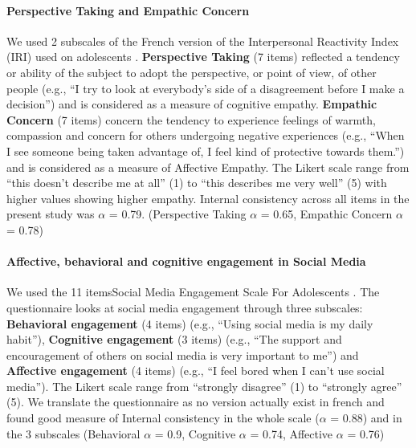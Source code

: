 \documentclass[preprint, 3p,
authoryear]{elsarticle} %
\begin{document}
\hypertarget{perspective-taking-and-empathic-concern}{%
\paragraph{Perspective Taking and Empathic
Concern}\label{perspective-taking-and-empathic-concern}}

We used 2 subscales of the French version \citep{gilet_assessing_2013}
of the Interpersonal Reactivity Index (IRI)
\citep{davis_interpersonal_1980} used on adolescents
\citep{hawk_examining_2013}. \textbf{Perspective Taking} (7 items)
reflected a tendency or ability of the subject to adopt the perspective,
or point of view, of other people (e.g., ``I try to look at everybody's
side of a disagreement before I make a decision'') and is considered as
a measure of cognitive empathy. \textbf{Empathic Concern} (7 items)
concern the tendency to experience feelings of warmth, compassion and
concern for others undergoing negative experiences (e.g., ``When I see
someone being taken advantage of, I feel kind of protective towards
them.'') and is considered as a measure of Affective Empathy. The Likert
scale range from ``this doesn't describe me at all'' (1) to ``this
describes me very well'' (5) with higher values showing higher empathy.
Internal consistency across all items in the present study was
\(\alpha\) = 0.79. (Perspective Taking \(\alpha\) = 0.65, Empathic
Concern \(\alpha\) = 0.78)

\hypertarget{affective-behavioral-and-cognitive-engagement-in-social-media}{%
\paragraph{Affective, behavioral and cognitive engagement in Social
Media}\label{affective-behavioral-and-cognitive-engagement-in-social-media}}

We used the 11 itemsSocial Media Engagement Scale For Adolescents
\citep{ni_development_2020}. The questionnaire looks at social media
engagement through three subscales: \textbf{Behavioral engagement} (4
items) (e.g., ``Using social media is my daily habit''),
\textbf{Cognitive engagement} (3 items) (e.g., ``The support and
encouragement of others on social media is very important to me'') and
\textbf{Affective engagement} (4 items) (e.g., ``I feel bored when I
can't use social media''). The Likert scale range from ``strongly
disagree'' (1) to ``strongly agree'' (5). We translate the questionnaire
as no version actually exist in french and found good measure of
Internal consistency in the whole scale (\(\alpha\) = 0.88) and in the 3
subscales (Behavioral \(\alpha\) = 0.9, Cognitive \(\alpha\) = 0.74,
Affective \(\alpha\) = 0.76)
\end{document}
